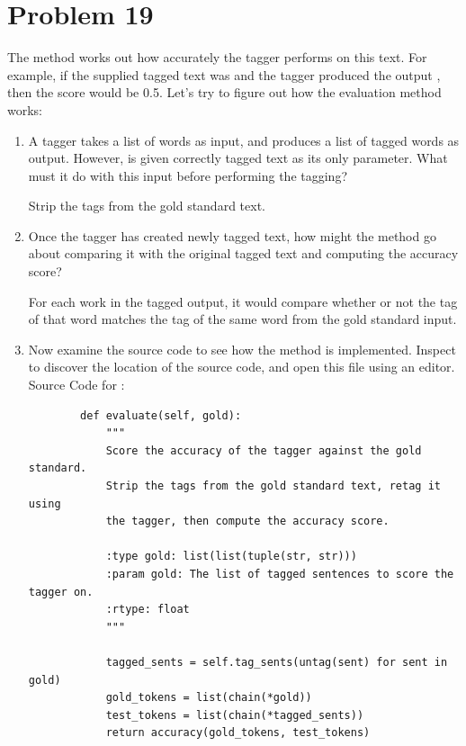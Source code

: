 \documentclass[12pt]{article}
\begin{document}
	\section*{Problem 19}
	The  method works out how accurately the tagger performs on this text. For example, if the supplied tagged text was  and the tagger produced the output , then the score would be 0.5. Let's try to figure out how the evaluation method works:
	\begin{enumerate}
		\item A tagger  takes a list of words as input, and produces a list of tagged words as output. However,  is given correctly tagged text as its only parameter. What must it do with this input before performing the tagging?
		
		Strip the tags from the gold standard text.
		
		\item Once the tagger has created newly tagged text, how might the  method go about comparing it with the original tagged text and computing the accuracy score?
		
		For each work in the tagged output, it would compare whether or not the tag of that word matches the tag of the same word from the gold standard input.
		
		\item Now examine the source code to see how the method is implemented. Inspect  to discover the location of the source code, and open this file using an editor.\\
		
		Source Code for :
		\begin{lstlisting}
		def evaluate(self, gold):
			"""
			Score the accuracy of the tagger against the gold standard.
			Strip the tags from the gold standard text, retag it using
			the tagger, then compute the accuracy score.
			
			:type gold: list(list(tuple(str, str)))
			:param gold: The list of tagged sentences to score the tagger on.
			:rtype: float
			"""
			
			tagged_sents = self.tag_sents(untag(sent) for sent in gold)
			gold_tokens = list(chain(*gold))
			test_tokens = list(chain(*tagged_sents))
			return accuracy(gold_tokens, test_tokens)
		\end{lstlisting}
	\end{enumerate}
	
\end{document}
